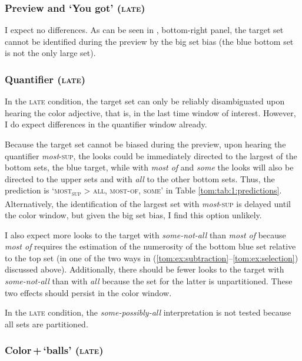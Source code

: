 \documentclass[output=paper]{langscibook}
\begin{document}
\subsubsection{Preview and `You got' (\textsc{late})}

I expect no differences. As can be seen in , bottom-right panel, the target set cannot be identified during the
preview by the big set bias (the blue bottom set is not the only large set).
\bigskip

\subsubsection{Quantifier (\textsc{late})}

In the \textsc{late} condition, the target set can only be reliably disambiguated upon hearing the color adjective, that is, in
the last time window of interest. However, I do expect differences in the quantifier window already.

Because the target set cannot be biased during the preview, upon hearing the quantifier \textit{most}\textsc{-sup}, the
looks could be immediately directed to the largest of the bottom sets, the blue target, while with \textit{most of} and
\textit{some} the looks will also be directed to the upper sets and with \textit{all} to the other bottom sets. Thus,
the prediction is `\textsc{most\textsubscript{sup}} {\textgreater} \textsc{all}, \textsc{most-of}, \textsc{some}' in
Table \ref{tom:tab:1:predictions}. Alternatively, the identification of the largest set with \textit{most}\textsc{-sup} is delayed until the
color window, but given the big set bias, I find this option unlikely.

I also expect more looks to the target with \textit{some-not-all} than \textit{most of} because \textit{most of}
requires the estimation of the numerosity of the bottom blue set relative to the top set (in one of the two ways in (\ref{tom:ex:subtraction}--\ref{tom:ex:selection}) discussed above). Additionally, there should be fewer looks to the target with \textit{some-not-all} than with
\textit{all} because the set for the latter is unpartitioned. These two effects should persist in the color window.

In the \textsc{late} condition, the \textit{some-possibly-all} interpretation is not tested because all sets are partitioned.

\subsubsection{Color\,+\,`balls' (\textsc{late})}
\end{document}
